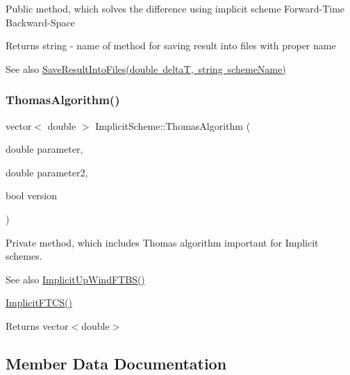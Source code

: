 Public method, which solves the difference using implicit scheme Forward-\/\+Time Backward-\/\+Space \begin{DoxyReturn}{Returns}
string -\/ name of method for saving result into files with proper name 
\end{DoxyReturn}
\begin{DoxySeeAlso}{See also}
\mbox{\hyperlink{class_scheme_ae4512b4c8ead4d8ced95174f0b241f8a}{Save\+Result\+Into\+Files(double delta\+T, string scheme\+Name)}} 
\end{DoxySeeAlso}
\mbox{\label{class_implicit_scheme_a2f0cee270b60bc42f8f5e864255f5e29}} 
\subsubsection{\texorpdfstring{Thomas\+Algorithm()}{ThomasAlgorithm()}}
{\footnotesize\ttfamily vector$<$ double $>$ Implicit\+Scheme\+::\+Thomas\+Algorithm (\begin{DoxyParamCaption}\item[{double}]{parameter,  }\item[{double}]{parameter2,  }\item[{bool}]{version }\end{DoxyParamCaption})\hspace{0.3cm}{\ttfamily [private]}}

Private method, which includes Thomas algorithm important for Implicit schemes. \begin{DoxySeeAlso}{See also}
\mbox{\hyperlink{class_implicit_scheme_ab8311a005d69690622e0ddaa0dcff94d}{Implicit\+Up\+Wind\+F\+T\+B\+S()}} 

\mbox{\hyperlink{class_implicit_scheme_afd2b8e73e914a04c326b8cba0d5810ce}{Implicit\+F\+T\+C\+S()}} 
\end{DoxySeeAlso}
\begin{DoxyReturn}{Returns}
vector$<$double$>$ 
\end{DoxyReturn}


\subsection{Member Data Documentation}
\mbox{\label{class_implicit_scheme_a9bd3d0a458683f9a17e8d11016c9f879}} 
